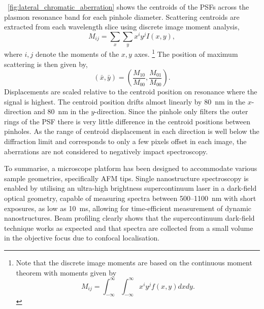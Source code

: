 \documentclass{article}
\begin{document}
\figurename~\ref{fig:lateral_chromatic_aberration} shows the centroids of the PSFs across the plasmon resonance band for each pinhole diameter. Scattering centroids are extracted from each wavelength slice using discrete image moment analysis,
\begin{equation}
	M_{ij} = \sum_x \sum_y x^i y^j I(x,y),
	\label{eq:image_moments}
\end{equation}
where $i,j$ denote the moments of the $x,y$ axes.%
\footnote{Note that the discrete image moments are based on the continuous moment theorem with moments given by $$M_{ij} = \int_{-\infty}^{\infty} \int_{-\infty}^{\infty} x^i y^j f(x,y) dx dy.$$}
The position of maximum scattering is then given by,
\begin{equation}
	(\bar{x},\bar{y}) = \left( \frac{M_{10}}{M_{00}}, \frac{M_{01}}{M_{00}} \right).
	\label{eq:centroid_position}
\end{equation}
Displacements are scaled relative to the centroid position on resonance where the signal is highest. The centroid position drifts almost linearly by \SI{80}{nm} in the $x$-direction and \SI{80}{nm} in the $y$-direction. Since the pinhole only filters the outer rings of the PSF there is very little difference in the centroid positions between pinholes. As the range of centroid displacement in each direction is well below the diffraction limit and corresponds to only a few pixels offset in each image, the aberrations are not considered to negatively impact spectroscopy. %

To summarise, a microscope platform has been designed to accommodate various sample geometries, specifically AFM tips. Single nanostructure spectroscopy is enabled by utilising an ultra-high brightness supercontinuum laser in a dark-field optical geometry, capable of measuring spectra between 500--\SI{1100}{nm} with short exposures, as low as \SI{10}{ms}, allowing for time-efficient measurement of dynamic nanostructures. Beam profiling clearly shows that the supercontinuum dark-field technique works as expected and that spectra are collected from a small volume in the objective focus due to confocal localisation.

\FloatBarrier
\end{document}
